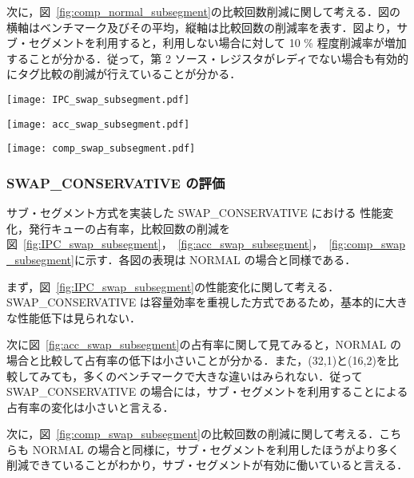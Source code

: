 \documentclass[twocolumn]{jsarticle}
\begin{document}
  次に，図~\ref{fig:comp_normal_subsegment}の比較回数削減に関して考える．図の横軸はベンチマーク及びその平均，縦軸は比較回数の削減率を表す．図より，サブ・セグメントを利用すると，利用しない場合に対して 10 \% 程度削減率が増加することが分かる．従って，第 2 ソース・レジスタがレディでない場合も有効的にタグ比較の削減が行えていることが分かる．

  \begin{figure*}[ht]
    \centering
    \texttt{[image: IPC\_swap\_subsegment.pdf]}
    \caption{サブ・セグメントによる性能変化(SWAP\_CONSERVATIVE)}
    \label{fig:IPC_swap_subsegment}
  \end{figure*}

  \begin{figure*}[ht]
    \centering
    \texttt{[image: acc\_swap\_subsegment.pdf]}
    \caption{サブ・セグメントによる IQ 占有率の変化(SWAP\_CONSERVATIVE)}
    \label{fig:acc_swap_subsegment}
  \end{figure*}

  \begin{figure*}[ht]
    \centering
    \texttt{[image: comp\_swap\_subsegment.pdf]}
    \caption{サブ・セグメントによる比較回数削減率(SWAP\_CONSERVATIVE)}
    \label{fig:comp_swap_subsegment}
  \end{figure*}

  \subsubsection{SWAP\_CONSERVATIVE の評価}
  サブ・セグメント方式を実装した SWAP\_CONSERVATIVE における 性能変化，発行キューの占有率，比較回数の削減を図~\ref{fig:IPC_swap_subsegment}，~\ref{fig:acc_swap_subsegment}，~\ref{fig:comp_swap_subsegment}に示す．各図の表現は NORMAL の場合と同様である．

  まず，図~\ref{fig:IPC_swap_subsegment}の性能変化に関して考える．SWAP\_CONSERVATIVE は容量効率を重視した方式であるため，基本的に大きな性能低下は見られない．
  
  次に図~\ref{fig:acc_swap_subsegment}の占有率に関して見てみると，NORMAL の場合と比較して占有率の低下は小さいことが分かる．また，(32,1)と(16,2)を比較してみても，多くのベンチマークで大きな違いはみられない．従ってSWAP\_CONSERVATIVE の場合には，サブ・セグメントを利用することによる占有率の変化は小さいと言える．

  次に，図~\ref{fig:comp_swap_subsegment}の比較回数の削減に関して考える．こちらも NORMAL の場合と同様に，サブ・セグメントを利用したほうがより多く削減できていることがわかり，サブ・セグメントが有効に働いていると言える．
\end{document}

